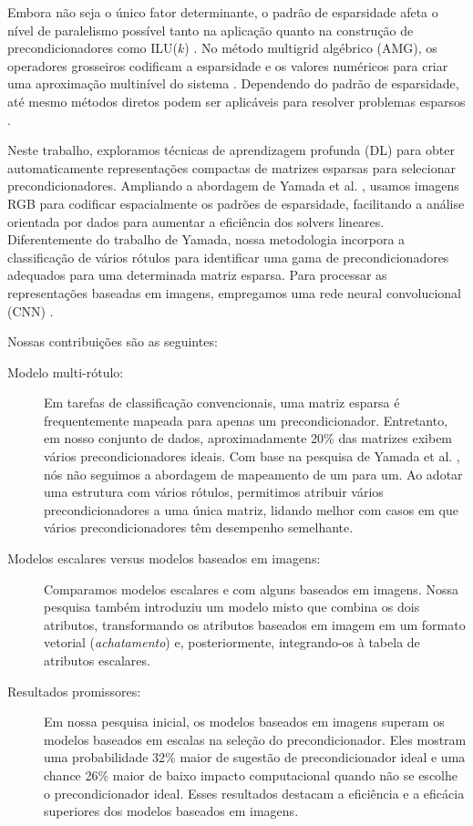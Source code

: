 \documentclass{pssbmac}
\begin{document}
Embora não seja o único fator determinante, o padrão de esparsidade afeta o 
nível de paralelismo possível tanto na aplicação quanto na construção de precondicionadores 
como ILU($k$) \cite{Meijerink1977AnIS, saad2003iterative}. No método multigrid algébrico (AMG),
os operadores grosseiros codificam a esparsidade e os valores numéricos para criar 
uma aproximação multinível do sistema \cite{stuben2001AReview}. Dependendo do padrão 
de esparsidade, até mesmo métodos diretos podem ser aplicáveis para resolver 
problemas esparsos \cite{Davis2016ASO}.

Neste trabalho, exploramos técnicas de aprendizagem profunda (DL) para obter 
automaticamente representações compactas de matrizes esparsas para selecionar 
precondicionadores. Ampliando a abordagem de Yamada et al. \cite{yamada2018preconditioner}, 
usamos imagens RGB para codificar espacialmente os padrões de esparsidade, 
facilitando a análise orientada por dados para aumentar a eficiência dos solvers lineares. 
Diferentemente do trabalho de Yamada, nossa metodologia incorpora a classificação 
de vários rótulos para identificar uma gama de precondicionadores adequados 
para uma determinada matriz esparsa. Para processar as representações baseadas 
em imagens, empregamos uma rede neural convolucional (CNN) \cite{li2022survey}.

Nossas contribuições são as seguintes: 
 \begin{description}  
\item [Modelo multi-rótulo:] Em tarefas de classificação convencionais, 
uma matriz esparsa é frequentemente mapeada para apenas um precondicionador. 
Entretanto, em nosso conjunto de dados, aproximadamente 20\% das matrizes exibem 
vários precondicionadores ideais. Com base na pesquisa de Yamada et al.
\cite{yamada2018preconditioner}, nós não seguimos a abordagem de mapeamento de um para um. 
Ao adotar uma estrutura com vários rótulos, permitimos atribuir vários precondicionadores 
a uma única matriz, lidando melhor com casos em que vários precondicionadores têm desempenho 
semelhante.  
\item [Modelos escalares versus modelos baseados em imagens:] Comparamos modelos escalares 
e com alguns baseados em imagens. Nossa pesquisa também introduziu um modelo misto que combina 
os dois atributos, transformando os atributos baseados em imagem em um formato 
vetorial (\emph{achatamento}) e, posteriormente, integrando-os à tabela de atributos escalares.  
\item[Resultados promissores:] Em nossa pesquisa inicial, os modelos baseados em imagens 
superam os modelos baseados em escalas na seleção do precondicionador. Eles mostram 
uma probabilidade 32\% maior de sugestão de precondicionador ideal e uma chance 26\% maior 
de baixo impacto computacional quando não se escolhe o precondicionador ideal. Esses 
resultados destacam a eficiência e a eficácia superiores dos modelos baseados em imagens.  
\end{description}
\end{document}
